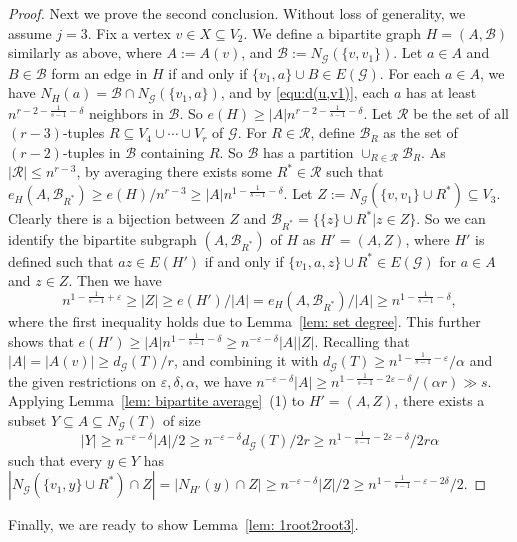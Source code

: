 \documentclass[11pt]{article}
\begin{document}
\begin{proof}
Next we prove the second conclusion.
Without loss of generality, we assume $j=3$.
Fix a vertex $v\in X\subseteq V_2$.
We define a bipartite graph $H=(A,\mathcal B)$ similarly as above,
where $A:=A(v)$, and $\mathcal B:= N_{\mathcal G}(\{v,v_{1}\})$.
Let $a\in A$ and $B\in \mathcal B$ form an edge in $H$ if and only if $\{v_{1},a\}\cup B\in E(\mathcal G)$.
For each $a \in A$, we have $N_H(a) = \mathcal{B} \cap N_\mathcal{G}(\{v_1,a\})$,
and by \eqref{equ:d(u,v1)}, each $a$ has at least $n^{r-2-\frac{1}{s-1}- \delta}$ neighbors in $\mathcal{B}$.
So $e(H)\ge |A|n^{r-2-\frac{1}{s-1} -\delta} $.
Let $\mathcal R$ be the set of all $(r-3)$-tuples $R\subseteq V_4\cup \cdots\cup V_{r}$ of $\mathcal G$.
For $R\in \mathcal R$, define $\mathcal B_R$ as the set of $(r-2)$-tuples in $\mathcal B$ containing $R$.
So $\mathcal B$ has a partition $\cup_{R\in \mathcal R}\mathcal B_R$.
As $|\mathcal R|\le n^{r-3}$, by averaging there exists some $R^*\in \mathcal R$ such that
$e_H(A,\mathcal B_{R^*})\ge e(H)/n^{r-3}\ge |A|n^{1-\frac{1}{s-1}-\delta}$.
Let $Z:= N_{\mathcal G}(\{v,v_1\}\cup R^*)\subseteq V_3$.
Clearly there is a bijection between $Z$ and $\mathcal B_{R^*}=\{\{z\}\cup R^*| z\in Z\}$.
So we can identify the bipartite subgraph $(A, \mathcal B_{R^*})$ of $H$ as $H'=(A,Z)$,
where $H'$ is defined such that $az\in E(H')$ if and only if $\{v_1,a,z\}\cup R^*\in E(\mathcal{G})$ for $a\in A$ and $z\in Z$.
Then we have $$n^{1-\frac{1}{s-1} + \varepsilon}\geq |Z|\geq e(H')/|A|= e_H(A,\mathcal B_{R^*})/|A|\geq n^{1-\frac{1}{s-1}-\delta},$$
where the first inequality holds due to Lemma~\ref{lem: set degree}.
This further shows that $e(H') \ge |A|n^{1-\frac{1}{s-1}  -\delta} \ge n^{-\varepsilon -\delta}|A||Z|$.
Recalling that $|A|=|A(v)|\geq d_{\mathcal G}(T)/r$, and combining it with $d_{\mathcal G}(T)\geq n^{1-\frac{1}{s-1}- \varepsilon}/\alpha$ and the given restrictions on $\varepsilon, \delta, \alpha$,
we have
$n^{-\varepsilon -\delta}|A|\geq n^{1-\frac{1}{s-1}- 2\varepsilon-\delta}/(\alpha r)\gg s$.
Applying Lemma~\ref{lem: bipartite average}~(1) to $H'=(A,Z)$,
there exists a subset $Y\subseteq A\subseteq N_{\mathcal G}(T)$ of size
$$|Y|\geq n^{-\varepsilon -\delta}|A|/2\ge n^{-\varepsilon -\delta}d_{\mathcal G}(T) /2r\ge n^{1-\frac{1}{s-1}  - 2 \varepsilon -\delta}/2r\alpha$$
such that every $y\in Y$ has
$|N_{\mathcal G}(\{v_1, y\}\cup R^*)\cap Z|=|N_{H'}(y)\cap Z |\ge  n^{ -  \varepsilon -\delta}|Z |/2\ge n^{1-\frac{1}{s-1}  -  \varepsilon-2\delta}/2$.
\end{proof}

Finally, we are ready to show Lemma~\ref{lem: 1root2root3}.
\end{document}
